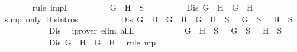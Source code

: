 \begin{isabellebody}
\ \ \ \ \ \ \isamarkupfalse%
\ {\isacharparenleft}rule\ impI{\isacharparenright}\isanewline
\ \ \ \ \ \ \ \ \isamarkupfalse%
\ {\isachardoublequoteopen}\isactrlbold {\isasymnot}{\isacharparenleft}G\ \isactrlbold {\isasymand}\ H{\isacharparenright}\ {\isasymin}\ S{\isachardoublequoteclose}\isanewline
\ \ \ \ \ \ \ \ \isamarkupfalse%
\ {\isachardoublequoteopen}Dis\ {\isacharparenleft}\isactrlbold {\isasymnot}{\isacharparenleft}G\ \isactrlbold {\isasymand}\ H{\isacharparenright}{\isacharparenright}\ {\isacharparenleft}\isactrlbold {\isasymnot}\ G{\isacharparenright}\ {\isacharparenleft}\isactrlbold {\isasymnot}\ H{\isacharparenright}{\isachardoublequoteclose}\isanewline
\ \ \ \ \ \ \ \ \ \ \isamarkupfalse%
\ {\isacharparenleft}simp\ only{\isacharcolon}\ Dis{\isachardot}intros{\isacharparenleft}{}{\isacharparenright}{\isacharparenright}\isanewline
\ \ \ \ \ \ \ \ \isamarkupfalse%
\ {\isachardoublequoteopen}Dis\ {\isacharparenleft}\isactrlbold {\isasymnot}{\isacharparenleft}G\ \isactrlbold {\isasymand}\ H{\isacharparenright}{\isacharparenright}\ {\isacharparenleft}\isactrlbold {\isasymnot}\ G{\isacharparenright}\ {\isacharparenleft}\isactrlbold {\isasymnot}\ H{\isacharparenright}\ {\isasymlongrightarrow}\ \isactrlbold {\isasymnot}{\isacharparenleft}G\ \isactrlbold {\isasymand}\ H{\isacharparenright}\ {\isasymin}\ S\ {\isasymlongrightarrow}\ \isactrlbold {\isasymnot}\ G\ {\isasymin}\ S\ {\isasymor}\ \isactrlbold {\isasymnot}\ H\ {\isasymin}\ S{\isachardoublequoteclose}\isanewline
\ \ \ \ \ \ \ \ \ \ \isamarkupfalse%
\ Dis\ \isamarkupfalse%
\ {\isacharparenleft}iprover\ elim{\isacharcolon}\ allE{\isacharparenright}\isanewline
\ \ \ \ \ \ \ \ \isamarkupfalse%
\ \isamarkupfalse%
\ {\isachardoublequoteopen}\isactrlbold {\isasymnot}{\isacharparenleft}G\ \isactrlbold {\isasymand}\ H{\isacharparenright}\ {\isasymin}\ S\ {\isasymlongrightarrow}\ \isactrlbold {\isasymnot}\ G\ {\isasymin}\ S\ {\isasymor}\ \isactrlbold {\isasymnot}\ H\ {\isasymin}\ S{\isachardoublequoteclose}\isanewline
\ \ \ \ \ \ \ \ \ \ \isamarkupfalse%
\ {\isacartoucheopen}Dis\ {\isacharparenleft}\isactrlbold {\isasymnot}{\isacharparenleft}G\ \isactrlbold {\isasymand}\ H{\isacharparenright}{\isacharparenright}\ {\isacharparenleft}\isactrlbold {\isasymnot}\ G{\isacharparenright}\ {\isacharparenleft}\isactrlbold {\isasymnot}\ H{\isacharparenright}{\isacartoucheclose}\ \isamarkupfalse%
\ {\isacharparenleft}rule\ mp{\isacharparenright}\isanewline

\end{isabellebody}
